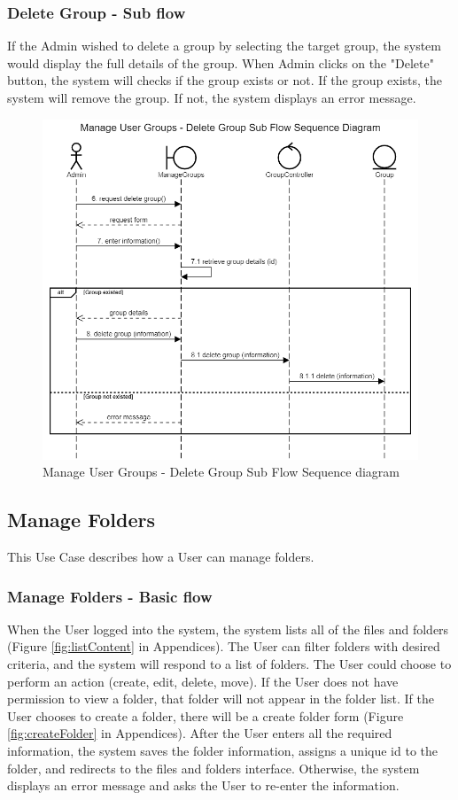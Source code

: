 \subsubsection{Delete Group - Sub flow}
If the Admin wished to delete a group by selecting the target group, the system would display the full details of the group. When Admin clicks on the "Delete" button, the system will checks if the group exists or not. If the group exists, the system will remove the group. If not, the system displays an error message.
\begin{figure}[H]
    \centering
    \includegraphics[width=1.0\textwidth]{images/Manage User Groups - Delete Group Sub Flow Sequence Diagram.png}
    \caption{Manage User Groups - Delete Group Sub Flow Sequence diagram}
    \label{fig:SeqGroupsDelete}
\end{figure}

\subsection{Manage Folders}
This Use Case describes how a User can manage folders.

\subsubsection{Manage Folders - Basic flow}
When the User logged into the system, the system lists all of the files and folders (Figure \ref{fig:listContent} in Appendices). The User can filter folders with desired criteria, and the system will respond to a list of folders. The User could choose to perform an action (create, edit, delete, move). If the User does not have permission to view a folder, that folder will not appear in the folder list. If the User chooses to create a folder, there will be a create folder form (Figure \ref{fig:createFolder} in Appendices). After the User enters all the required information, the system saves the folder information, assigns a unique id to the folder, and redirects to the files and folders interface. Otherwise, the system displays an error message and asks the User to re-enter the information. 

